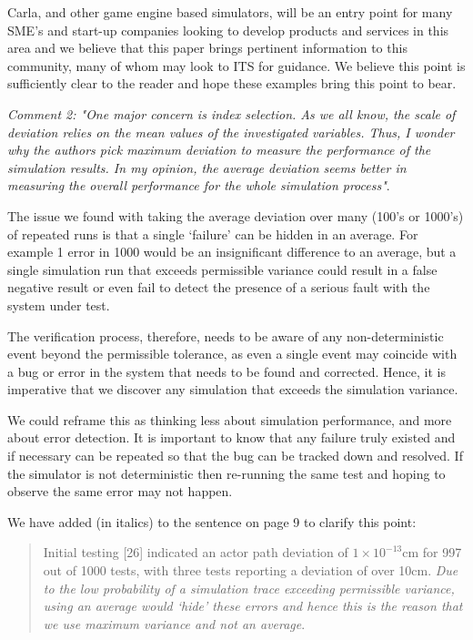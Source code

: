 \documentclass[11pt, a4paper]{letter} %
\begin{document}
\begin{letter}
Carla, and other game engine based simulators, will be an entry point for many SME's and start-up companies looking to develop products and services in this area and we believe that this paper brings pertinent information to this community, many of whom may look to ITS for guidance. We believe this point is sufficiently clear to the reader and hope these examples bring this point to bear.


\bigskip

\textit{Comment 2: "One major concern is index selection. As we all know, the scale of deviation relies on the mean values of the investigated variables. Thus, I wonder why the authors pick maximum deviation to measure the performance of the simulation results. In my opinion, the average deviation seems better in measuring the overall performance for the whole simulation process"}.

The issue we found with taking the average deviation over many (100's or 1000's) of repeated runs is that a single `failure' can be hidden in an average. For example 1 error in 1000 would be an insignificant difference to an average, but a single simulation run that exceeds permissible variance could result in a false negative result or even fail to detect the presence of a serious fault with the system under test. 

The verification process, therefore, needs to be aware of any non-deterministic event beyond the permissible tolerance, as even a single event may coincide with a bug or error in the system that needs to be found and corrected. Hence, it is imperative that we discover any simulation that exceeds the simulation variance. 

We could reframe this as thinking less about simulation performance, and more about error detection. It is important to know that any failure truly existed and if necessary can be repeated so that the bug can be tracked down and resolved. If the simulator is not deterministic then re-running the same test and hoping to observe the same error may not happen.

We have added (in italics) to the sentence on page 9 to clarify this point:  
\begin{quote} 
Initial testing [26] indicated an actor path deviation of $1\times10^{-13}$cm for 997 out of 1000 tests, with three tests reporting a deviation of over 10cm. \textit{Due to the low probability of a simulation trace exceeding permissible variance, using an average would `hide' these errors and hence this is the reason that we use maximum variance and not an average}. 
\end{quote}


\end{letter}
\end{document}
